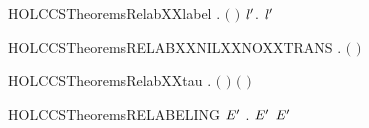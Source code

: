 \newcommand{\HOLCCSTheoremsRELABXXcasesXXEQ}{\UseVerbatim{HOLCCSTheoremsRELABXXcasesXXEQ}}
\begin{SaveVerbatim}{HOLCCSTheoremsRelabXXlabel}
\HOLTokenTurnstile{} \HOLSymConst{\HOLTokenForall{}}  . \ensuremath{(}   \HOLSymConst{\ensuremath{=}}  \ensuremath{)} \HOLSymConst{\HOLTokenImp{}} \HOLSymConst{\HOLTokenExists{}}\ensuremath{\HOLBoundVar{l}\sp{\prime}}.  \HOLSymConst{\ensuremath{=}}  \ensuremath{\HOLBoundVar{l}\sp{\prime}}
\end{SaveVerbatim}
\newcommand{\HOLCCSTheoremsRelabXXlabel}{\UseVerbatim{HOLCCSTheoremsRelabXXlabel}}
\begin{SaveVerbatim}{HOLCCSTheoremsRELABXXNILXXNOXXTRANS}
\HOLTokenTurnstile{} \HOLSymConst{\HOLTokenForall{}}  . \HOLSymConst{\HOLTokenNeg{}}\ensuremath{(}   \HOLTokenTransBegin{}\HOLTokenTransEnd {}\ensuremath{)}
\end{SaveVerbatim}
\newcommand{\HOLCCSTheoremsRELABXXNILXXNOXXTRANS}{\UseVerbatim{HOLCCSTheoremsRELABXXNILXXNOXXTRANS}}
\begin{SaveVerbatim}{HOLCCSTheoremsRelabXXtau}
\HOLTokenTurnstile{} \HOLSymConst{\HOLTokenForall{}} . \ensuremath{(}   \HOLSymConst{\ensuremath{=}} \HOLConst{\ensuremath{\tau}}\ensuremath{)} \HOLSymConst{\HOLTokenImp{}} \ensuremath{(} \HOLSymConst{\ensuremath{=}} \HOLConst{\ensuremath{\tau}}\ensuremath{)}
\end{SaveVerbatim}
\newcommand{\HOLCCSTheoremsRelabXXtau}{\UseVerbatim{HOLCCSTheoremsRelabXXtau}}
\begin{SaveVerbatim}{HOLCCSTheoremsRELABELING}
\HOLTokenTurnstile{} \HOLSymConst{\HOLTokenForall{}}  \ensuremath{\HOLBoundVar{E}\sp{\prime}} .  \HOLTokenTransBegin{}\HOLTokenTransEnd \ensuremath{\HOLBoundVar{E}\sp{\prime}} \HOLSymConst{\HOLTokenImp{}}    \HOLTokenTransBegin{}  \HOLTokenTransEnd {} \ensuremath{\HOLBoundVar{E}\sp{\prime}} 
\end{SaveVerbatim}
\newcommand{\HOLCCSTheoremsRELABELING}{\UseVerbatim{HOLCCSTheoremsRELABELING}}
